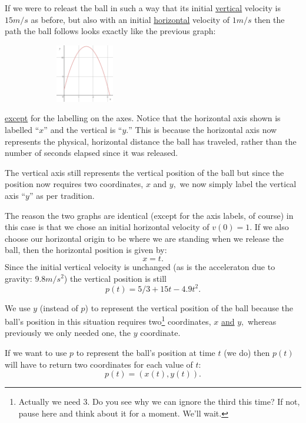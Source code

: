 If we were to releast the ball in such a way that its initial
\underline{vertical} velocity is $15 m/s$ as before, but also with an
initial \underline{horizontal} velocity of $1 m/s$ then the path the
ball follows looks exactly like the previous graph:

\begin{figure}
\captionsetup{labelformat=empty}
\centerline{\includegraphics*[height=1in,width=2in]{Figures/FallingBallPath1}}
\label{fig:FallingBallPath1}
\end{figure}
\noindent{}\underline{except} for the labelling on the axes. Notice that the
horizontal axis shown is labelled ``$x$'' and the vertical is
``$y.$'' This is because the horizontal axis now represents the
physical, horizontal distance the ball has traveled, rather than the
number of seconds elapsed since it was released.

The vertical axis still represents the vertical position of the ball
but since the position now requires two coordinates, $x$ and $y,$ we
now simply label the vertical axis ``$y$'' as per tradition. 

The reason the two graphs are identical (except for the axis labels,
of course) in this case is that we chose an initial horizontal
velocity of $v(0)=1.$ If we also choose our horizontal origin to be
where we are standing when we release the ball, then the horizontal
position is given by:
$$
x=t.
$$
Since the initial vertical velocity is unchanged (as is the
acceleraton due to gravity: $9.8 m/s^2$) the vertical position is
still 
$$
p(t) = 5/3 + 15t-4.9t^2.
$$

We use $y$ (instead of $p$) to represent the vertical position of the
ball because the ball's position in this situation requires
two\footnote{Actually we need $3.$ Do you see why we can ignore the
  third this time? If not, pause here and think about it for a moment.
We'll wait.}
coordinates, $x$ \underline{and} $y,$ whereas previously we only
needed one, the $y$ coordinate.

If we want to use $p$ to represent the ball's position at time $t$ (we
do) then $p(t)$  will have to return two coordinates for each value of
$t:$
$$
p(t) = \left(x(t), y(t)\right).
$$

